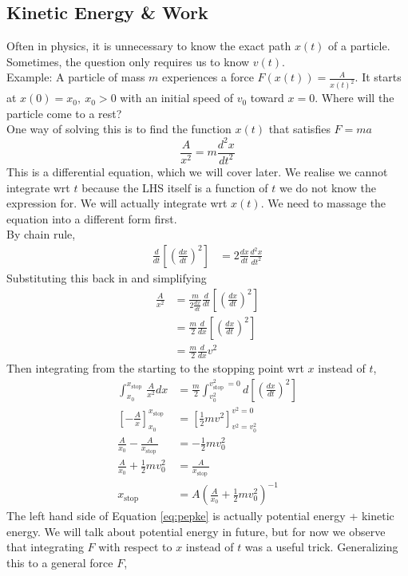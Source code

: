 \documentclass{article}
\begin{document}
\subsection{Kinetic Energy \& Work}
Often in physics, it is unnecessary to know the exact path $x(t)$ of a particle. Sometimes, the question only requires us to know $v(t)$. \\[10pt]
Example: A particle of mass $m$ experiences a force $F(x(t)) = \frac{A}{x(t)^2}$. It starts at $x(0)=x_0,\ x_0 > 0$ with an initial speed of $v_0$ toward $x=0$. Where will the particle come to a rest? \\[10pt]
One way of solving this is to find the function $x(t)$ that satisfies $F=ma$
$$\frac{A}{x^2} = m \frac{d^2x}{dt^2}$$
This is a differential equation, which we will cover later. We realise we cannot integrate wrt $t$ because the LHS itself is a function of $t$ we do not know the expression for. We will actually integrate wrt $x(t)$. We need to massage the equation into a different form first.\\[10pt]
By chain rule,
\begin{align}
\frac{d}{d t}\left[\left(\frac{d x}{d t}\right)^2\right]&=2  \frac{d x}{d t} \frac{d^2 x}{d t^2} 
\end{align}
Substituting this back in and simplifying
\begin{align}
\frac{A}{x^2}&=\frac{m}{2 \frac{d x}{d t}} \frac{d}{d t}\left[\left(\frac{d x}{d t}\right)^2\right] \\
& =\frac{m}{2} \frac{d}{d x}\left[\left(\frac{d x}{d t}\right)^2\right] \\
& =\frac{m}{2} \frac{d}{d x} v^2 
\end{align}
Then integrating from the starting to the stopping point wrt $x$ instead of $t$,
\begin{align} 
\int_{x_0}^{x_{\text {stop }}} \frac{A}{x^2} d x&=\frac{m}{2} \int_{v_0^2}^{v_{\text {stop }}^2=0} d\left[\left(\frac{d x}{d t}\right)^2\right] \\
\left[-\frac{A}{x}\right]_{x_0}^{x_\text{stop}} &= \left[\frac{1}{2} m v^2\right]_{v^2=v_0^2}^{v^2=0} \\
\frac{A}{x_0}-\frac{A}{x_\text {stop }}&=-\frac{1}{2} m v_0^2 \\
\frac{A}{x_0}+\frac{1}{2} m v_0^2&=\frac{A}{x_\text {stop }} \label{eq:pepke}\\
x_{\text{stop}} &= A \left(\frac{A}{x_0}+\frac{1}{2} m v_0^2\right)^{-1}
\end{align}
The left hand side of Equation \ref{eq:pepke} is actually potential energy + kinetic energy. We will talk about potential energy in future, but for now we observe that integrating $F$ with respect to $x$ instead of $t$ was a useful trick. Generalizing this to a general force $F$,
\end{document}
